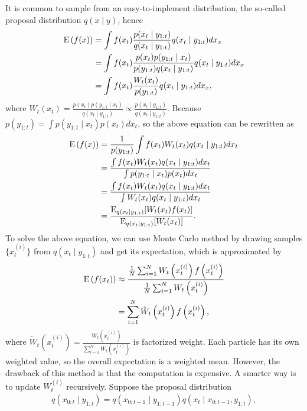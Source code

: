 It is common to sample from an easy-to-implement distribution, the so-called proposal distribution $q(x\mid y)$, hence
\begin{align*}
\mathrm{E}\left(f(x)\right) &= \int f(x_t )\frac{p(x_t \mid y_{1:t})}{q(x_t \mid y_{1:t})} q(x_t \mid y_{1:t})dx_x\\
&= \int f(x_t )\frac{p(x_t )p(y_{1:t}\mid x_t )}{p(y_{1:t})q(x_t \mid y_{1:t})} q(x_t \mid y_{1:t})dx_x\\
&= \int f(x_t )\frac{W_t (x_t )}{p(y_{1:t})} q(x_t \mid y_{1:t})dx_x,
\end{align*}
where $W_t (x_t )=\frac{p(x_t )p(y_{1:t}\mid x_t )}{q(x_t \mid y_{1:t})} \propto \frac{p(x_t \mid y_{1:t})}{q(x_t \mid y_{1:t})}$. Because $p(y_{1:t})=\int p(y_{1:t}\mid x_t )p(x_t )dx_t $, so the above equation can be rewritten as
\begin{align*}
\mathrm{E}\left(f(x)\right) &= \frac{1}{p(y_{1:t})}\int f(x_t )W_t (x_t )q(x_t \mid y_{1:t})dx_t \\
&= \frac{ \int f(x_t )W_t (x_t )q(x_t \mid y_{1:t})dx_t  }{\int p(y_{1:t}\mid x_t )p(x_t )dx_t } \\
&= \frac{ \int f(x_t )W_t (x_t )q(x_t \mid y_{1:t})dx_t  }{\int W_t (x_t )q(x_t \mid y_{1:t})dx_t } \\
&= \frac{\mathrm{E}_{q(x_t \mid y_{1:t})}[W_t (x_t )f(x_t )]}{\mathrm{E}_{q(x_t \mid y_{1:t})}[W_t (x_t )]}.
\end{align*}
To solve the above equation, we can use Monte Carlo method by drawing samples $\{x_t^{(i)}\}$ from $q(x_t \mid y_{1:t})$ and get its expectation, which is approximated by 
\begin{align}\label{PFexpectation}
\begin{split}
\mathrm{E}\left(f(x_t )\right) &\approx \frac{\frac{1}{N} \sum_{i=1}^{N} W_t\left(x_t^{(i)}\right)f\left(x_t^{(i)}\right)} {\frac{1}{N} \sum_{i=1}^{N} W_t\left(x_t^{(i)}\right)}\\
&= \sum_{i=1}^{N} \tilde{W}_t\left(x_t^{(i)}\right)f\left(x_t^{(i)}\right),
\end{split}
\end{align}
where $\tilde{W}_t\left(x_t^{(i)}\right) = \frac{ W_t\left(x_t^{(i)}\right)}{\sum_{i=1}^NW_t\left(x_t^{(i)}\right)}$ is factorized weight. Each particle has its own weighted value, so the overall expectation is a weighted mean. However, the drawback of this method is that the computation is expensive. A smarter way is to update $W_t^{(i)}$ recursively. Suppose the proposal distribution 
\begin{align*}
q(x_{0:t}\mid y_{1:t}) = q(x_{0:t-1}\mid y_{1:t-1}) q(x_t \mid  x_{0:t-1},y_{1:t}),
\end{align*}
